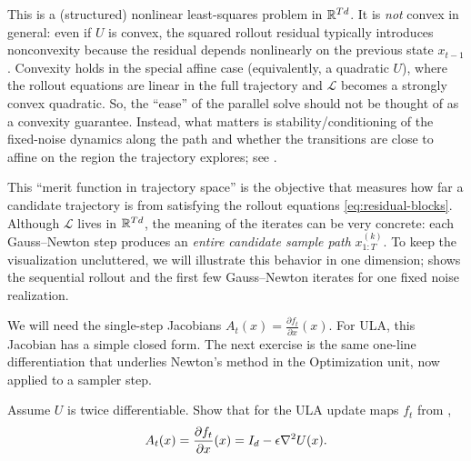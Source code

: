 \documentclass[11pt]{article}
\newif\ifshowsolutions
\newcommand{\SolutionBox}[2][10]{%
  \ifshowsolutions
    \begin{tcolorbox}[stat221panelgray,title={Solution}]
    #2
    \end{tcolorbox}
  \else
    \begin{tcolorbox}[stat221panelgray,unbreakable,title={Workspace}]
    \vspace{#1\baselineskip}
    \end{tcolorbox}
  \fi
}
\begin{document}
This is a (structured) nonlinear least-squares problem in $\mathbb{R}^{Td}$.
It is \emph{not} convex in general: even if $U$ is convex, the squared rollout residual typically introduces nonconvexity because the residual depends nonlinearly on the previous state $x_{t-1}$.
Convexity holds in the special affine case (equivalently, a quadratic $U$), where the rollout equations are linear in the full trajectory and $\mathcal{L}$ becomes a strongly convex quadratic.
So, the ``ease'' of the parallel solve should not be thought of as a convexity guarantee.
Instead, what matters is stability/conditioning of the fixed-noise dynamics along the path and whether the transitions are close to affine on the region the trajectory explores; see .

This ``merit function in trajectory space'' is the objective that measures how far a candidate trajectory is from satisfying the rollout equations \eqref{eq:residual-blocks}.
Although $\mathcal{L}$ lives in $\mathbb{R}^{Td}$, the meaning of the iterates can be very concrete:
each Gauss--Newton step produces an \emph{entire candidate sample path} $x_{1:T}^{(k)}$.
To keep the visualization uncluttered, we will illustrate this behavior in one dimension;
 shows the sequential rollout and the first few Gauss--Newton iterates for one fixed noise realization.

We will need the single-step Jacobians $A_t(x)=\frac{\partial f_t}{\partial x}(x)$.
For ULA, this Jacobian has a simple closed form.
The next exercise is the same one-line differentiation that underlies Newton's method in the Optimization unit, now applied to a sampler step.

\begin{exercise}
\label{ex:ula-jacobian}
Assume $U$ is twice differentiable.
Show that for the ULA update maps $f_t$ from ,
\[
A_t(x)=\frac{\partial f_t}{\partial x}(x) = I_d - \epsilon \nabla^2 U(x).
\]
\end{exercise}
\SolutionBox[10]{%
For fixed $\xi_t$, the update map is
\[
f_t(x)=x-\epsilon\nabla U(x)+\sqrt{2\epsilon}\,\xi_t.
\]
The derivative of $x\mapsto x$ is $I_d$.
The derivative of $x\mapsto -\epsilon\nabla U(x)$ is $-\epsilon\Hess U(x)$.
The noise term is constant in $x$, so its derivative is $0$.
Therefore $\frac{\partial f_t}{\partial x}(x)=I_d-\epsilon\Hess U(x)$.%
}
\end{document}
